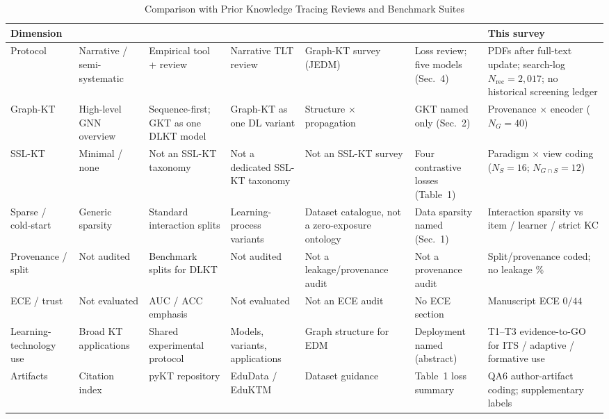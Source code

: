 \documentclass[lettersize,journal]{IEEEtran}
\begin{document}
\begin{table}[t]
\caption{Comparison with Prior Knowledge Tracing Reviews and Benchmark Suites}
\label{tab:survey_comparison}
\centering
\footnotesize
\setlength{\tabcolsep}{3.4pt}
\begin{tabular}{@{}>{\raggedright\arraybackslash}p{1.85cm}
>{\raggedright\arraybackslash}p{1.85cm}
>{\raggedright\arraybackslash}p{1.9cm}
>{\raggedright\arraybackslash}p{1.85cm}
>{\raggedright\arraybackslash}p{1.9cm}
>{\raggedright\arraybackslash}p{2.05cm}
>{\raggedright\arraybackslash}p{2.15cm}@{}}
\toprule
\textbf{Dimension} & \cite{Abdelrahman_Survey_2023} & \cite{Liu_pyKT_2022,Liu_DLKT_2025} & \cite{Shen_KTSurvey_2024} & \cite{Xu_GbKT_2026} & \cite{Shukurlu_LossKT_2025} & \textbf{This survey} \\
\midrule
Protocol & Narrative / semi-systematic & Empirical tool + review & Narrative TLT review & Graph-KT survey (JEDM) & Loss review; five models (Sec.~4) & 44 PDFs after full-text update; search-log $N_{\mathrm{rec}}=2{,}017$; no historical screening ledger \\
Graph-KT & High-level GNN overview & Sequence-first; GKT as one DLKT model & Graph-KT as one DL variant & Structure $\times$ propagation & GKT named only (Sec.~2) & Provenance $\times$ encoder ($N_G=40$) \\
SSL-KT & Minimal / none & Not an SSL-KT taxonomy & Not a dedicated SSL-KT taxonomy & Not an SSL-KT survey & Four contrastive losses (Table~1) & Paradigm $\times$ view coding ($N_S=16$; $N_{G\cap S}=12$) \\
Sparse / cold-start & Generic sparsity & Standard interaction splits & Learning-process variants & Dataset catalogue, not a zero-exposure ontology & Data sparsity named (Sec.~1) & Interaction sparsity vs item / learner / strict KC \\
Provenance / split & Not audited & Benchmark splits for DLKT & Not audited & Not a leakage/provenance audit & Not a provenance audit & Split/provenance coded; no leakage \% \\
ECE / trust & Not evaluated & AUC / ACC emphasis & Not evaluated & Not an ECE audit & No ECE section & Manuscript ECE $0/44$ \\
Learning-technology use & Broad KT applications & Shared experimental protocol & Models, variants, applications & Graph structure for EDM & Deployment named (abstract) & T1--T3 evidence-to-GO for ITS / adaptive / formative use \\
Artifacts & Citation index & pyKT repository & EduData / EduKTM & Dataset guidance & Table~1 loss summary & QA6 author-artifact coding; supplementary labels \\
\bottomrule
\end{tabular}
\end{table}
\end{document}
